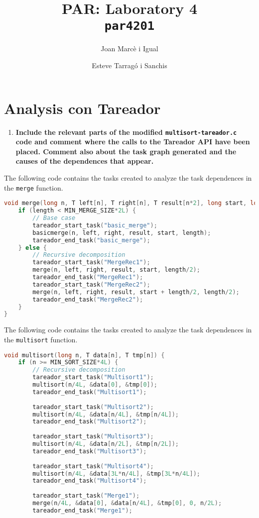 \documentclass[a4paper]{article}
\title{PAR: Laboratory 4 \\
		\texttt{\large par4201}}
\author{Joan Marcè i Igual \and Esteve Tarragó i Sanchis}
\newenvironment{questionenum}
{%
\setlist[enumerate]{resume}
\restartlist{enumerate}
\newcommand{\question}[1]{
\begin{enumerate}
	\item\bfseries ##1
\end{enumerate}
}}{%
}
\begin{document}
\maketitle
\tableofcontents

\section{Analysis con Tareador}
\begin{questionenum}
	\question{Include the relevant parts of the modified \texttt{multisort-tareador.c} code and comment where the calls to the Tareador API have been placed. Comment also about the task graph generated and the causes of the dependences that appear.}
	
	The following code contains the tasks created to analyze the task dependences in the \verb|merge| function.
\begin{lstlisting}[language=C]
void merge(long n, T left[n], T right[n], T result[n*2], long start, long length) {
	if (length < MIN_MERGE_SIZE*2L) {
		// Base case
		tareador_start_task("basic_merge");
		basicmerge(n, left, right, result, start, length);
		tareador_end_task("basic_merge");
	} else {
		// Recursive decomposition
		tareador_start_task("MergeRec1");
		merge(n, left, right, result, start, length/2);
		tareador_end_task("MergeRec1");
		tareador_start_task("MergeRec2");
		merge(n, left, right, result, start + length/2, length/2);
		tareador_end_task("MergeRec2");
	}
}
\end{lstlisting}

	The following code contains the tasks created to analyze the task dependences in the \verb|multisort| function.
	
\begin{lstlisting}[language=C]
void multisort(long n, T data[n], T tmp[n]) {
	if (n >= MIN_SORT_SIZE*4L) {
		// Recursive decomposition
		tareador_start_task("Multisort1");
		multisort(n/4L, &data[0], &tmp[0]);
		tareador_end_task("Multisort1");
		
		tareador_start_task("Multisort2");
		multisort(n/4L, &data[n/4L], &tmp[n/4L]);
		tareador_end_task("Multisort2");
		
		tareador_start_task("Multisort3");
		multisort(n/4L, &data[n/2L], &tmp[n/2L]);
		tareador_end_task("Multisort3");
		
		tareador_start_task("Multisort4");
		multisort(n/4L, &data[3L*n/4L], &tmp[3L*n/4L]);
		tareador_end_task("Multisort4");
		
		tareador_start_task("Merge1");
		merge(n/4L, &data[0], &data[n/4L], &tmp[0], 0, n/2L);
		tareador_end_task("Merge1");
		

\end{lstlisting}
\end{questionenum}
\end{document}
